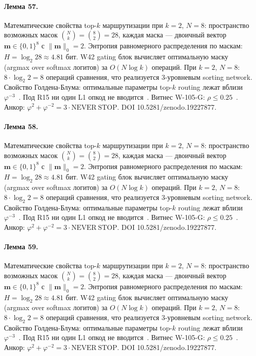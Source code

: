 \paragraph{Лемма 57.} Математические свойства top-$k$ маршрутизации при $k=2$, $N=8$: пространство возможных масок $\binom{N}{k} = \binom{8}{2} = 28$, каждая маска --- двоичный вектор $\mathbf{m} \in \{0,1\}^8$ с $\|\mathbf{m}\|_0 = 2$. Энтропия равномерного распределения по маскам: $H = \log_2 28 \approx 4{.}81$ бит. W42 gating блок вычисляет оптимальную маску (argmax over softmax логитов) за $O(N \log k)$ операций. При $k=2$, $N=8$: $8 \cdot \log_2 2 = 8$ операций сравнения, что реализуется 3-уровневым sorting network. Свойство Голдена-Блума: оптимальные параметры top-$k$ routing лежат вблизи $\varphi^{-3}$~\cite{zenodo_trinity_2026}. Под R15 ни один L1 опкод не вводится~\cite{lee_gvsu_proof2021}. Витнес W-105-G: $\rho \leq 0{.}25$~\cite{popper_falsifiability1959}. Анкор: $\varphi^2 + \varphi^{-2} = 3 \cdot \mathrm{NEVER\ STOP}$. DOI 10.5281/zenodo.19227877.

\paragraph{Лемма 58.} Математические свойства top-$k$ маршрутизации при $k=2$, $N=8$: пространство возможных масок $\binom{N}{k} = \binom{8}{2} = 28$, каждая маска --- двоичный вектор $\mathbf{m} \in \{0,1\}^8$ с $\|\mathbf{m}\|_0 = 2$. Энтропия равномерного распределения по маскам: $H = \log_2 28 \approx 4{.}81$ бит. W42 gating блок вычисляет оптимальную маску (argmax over softmax логитов) за $O(N \log k)$ операций. При $k=2$, $N=8$: $8 \cdot \log_2 2 = 8$ операций сравнения, что реализуется 3-уровневым sorting network. Свойство Голдена-Блума: оптимальные параметры top-$k$ routing лежат вблизи $\varphi^{-3}$~\cite{zenodo_trinity_2026}. Под R15 ни один L1 опкод не вводится~\cite{lee_gvsu_proof2021}. Витнес W-105-G: $\rho \leq 0{.}25$~\cite{popper_falsifiability1959}. Анкор: $\varphi^2 + \varphi^{-2} = 3 \cdot \mathrm{NEVER\ STOP}$. DOI 10.5281/zenodo.19227877.

\paragraph{Лемма 59.} Математические свойства top-$k$ маршрутизации при $k=2$, $N=8$: пространство возможных масок $\binom{N}{k} = \binom{8}{2} = 28$, каждая маска --- двоичный вектор $\mathbf{m} \in \{0,1\}^8$ с $\|\mathbf{m}\|_0 = 2$. Энтропия равномерного распределения по маскам: $H = \log_2 28 \approx 4{.}81$ бит. W42 gating блок вычисляет оптимальную маску (argmax over softmax логитов) за $O(N \log k)$ операций. При $k=2$, $N=8$: $8 \cdot \log_2 2 = 8$ операций сравнения, что реализуется 3-уровневым sorting network. Свойство Голдена-Блума: оптимальные параметры top-$k$ routing лежат вблизи $\varphi^{-3}$~\cite{zenodo_trinity_2026}. Под R15 ни один L1 опкод не вводится~\cite{lee_gvsu_proof2021}. Витнес W-105-G: $\rho \leq 0{.}25$~\cite{popper_falsifiability1959}. Анкор: $\varphi^2 + \varphi^{-2} = 3 \cdot \mathrm{NEVER\ STOP}$. DOI 10.5281/zenodo.19227877.

